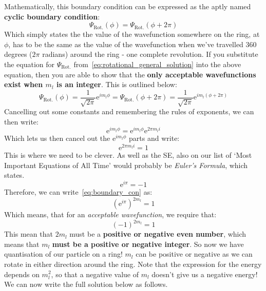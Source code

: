 \documentclass{memoir}[11pt,oneside,a4paper,openany]
\newcommand{\wf}{\ensuremath{\Psi}\xspace}
\begin{document}
Mathematically, this boundary condition can be expressed as the aptly named \textbf{cyclic boundary condition}:
\begin{equation}
	\wf_{\text{Rot.}}(\phi) = \wf_{\text{Rot.}}(\phi + 2\pi)
\end{equation}
Which simply states the the value of the wavefunction somewhere on the ring, at $\phi$, has to be the same as the value of the wavefunction when we've travelled 360 degrees ($2\pi$ radians) around the ring - one complete revolution. If you substitute the equation for $\wf_{\text{Rot.}}$ from~\autoref{eq:rotational_general_solution} into the above equation, then you are able to show that the \textbf{only acceptable wavefunctions exist when $m_l$ is an integer}. This is outlined below:
\begin{equation}
	\wf_{\text{Rot.}}(\phi) = \frac{1}{\sqrt{2\pi}}\mathrm{e}^{im_l\phi} = \wf_{\text{Rot.}}(\phi+2\pi) = \frac{1}{\sqrt{2\pi}}\mathrm{e}^{im_l(\phi+2\pi)}
\end{equation}
Cancelling out some constants and remembering the rules of exponents, we can then write:
\begin{equation}
	\mathrm{e}^{im_l\phi} = \mathrm{e}^{im_l\phi}\mathrm{e}^{2\pi m_li}
\end{equation}
Which lets us then cancel out the $\mathrm{e}^{im_l\phi}$ parts and write:
\begin{equation}\label{eq:boundary_con}
	\mathrm{e}^{2\pi m_li} = 1
\end{equation}
This is where we need to be clever. As well as the SE, also on our list of `Most Important Equations of All Time' would probably be \emph{Euler's Formula}, which states.
\begin{equation}
	\mathrm{e}^{i\pi} = -1
\end{equation}
Therefore, we can write~\autoref{eq:boundary_con} as:
\begin{equation}
	(\mathrm{e}^{i\pi})^{2m_l} = 1
\end{equation}
Which means, that for an \emph{acceptable wavefunction}, we require that:
\begin{equation}
	(-1)^{2m_l} = 1
\end{equation}
This mean that $2m_l$ must be a \textbf{positive or negative even number}, which means that $m_l$ \textbf{must be a positive or negative integer}. So now we have quantisation of our particle on a ring! $m_l$ can be positive or negative as we can rotate in either direction around the ring. Note that the expression for the energy depends on $m_l^2$, so that a negative value of $m_l$ doesn't give us a negative energy! We can now write the full solution below as follows.  
\end{document}

